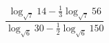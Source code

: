 \begin{ex}[type=calculate]
	\begin{condition}
		\( \dfrac{\log_{\sqrt{7}}14-\frac{1}{3}\log_{\sqrt{7}}56}{\log_{\sqrt{6}}30-\frac{1}{2}\log_{\sqrt{6}}150} \)
	\end{condition}
\end{ex}